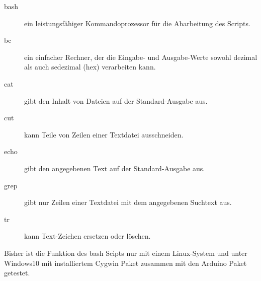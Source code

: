\begin{description}
\item [bash] ein leistungsfähiger Kommandoprozessor für die Abarbeitung des Scripts. 
\item [bc] ein einfacher Rechner, der die Eingabe- und Ausgabe-Werte
sowohl dezimal als auch sedezimal (hex) verarbeiten kann.
\item [cat] gibt den Inhalt von Dateien auf der Standard-Ausgabe aus.
\item [cut] kann Teile von Zeilen einer Textdatei ausschneiden.
\item [echo] gibt den angegebenen Text auf der Standard-Ausgabe aus.
\item [grep] gibt nur Zeilen einer Textdatei mit dem angegebenen Suchtext aus.
\item [tr] kann Text-Zeichen ersetzen oder löschen.
\end{description}

Bisher ist die Funktion des bash Scipts nur mit einem Linux-System und
unter Windows10 mit installiertem Cygwin Paket zusammen mit den Arduino Paket getestet.

